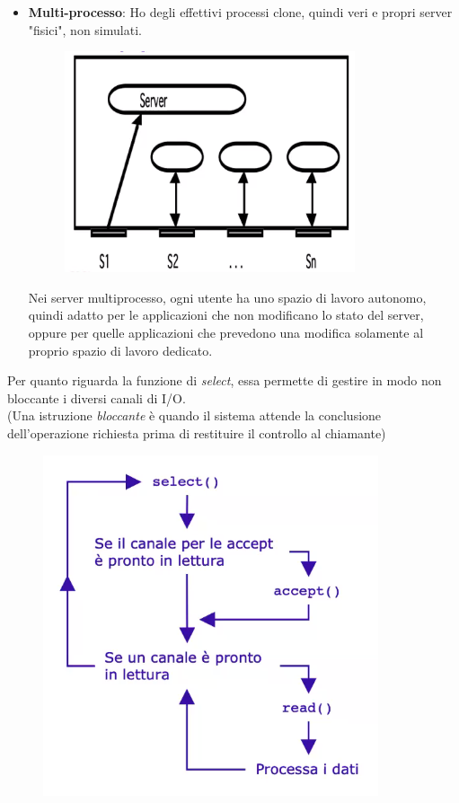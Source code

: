 \documentclass[12pt, a4paper]{article}
\begin{document}
\begin{itemize}
        \item \textbf{Multi-processo}:
        Ho degli effettivi processi clone, quindi veri e propri server "fisici", non simulati.

        \begin{figure}[htbp]
            \centering
            \includegraphics[scale=0.5]{multiprocesso.png}
            
            
        \end{figure}
        Nei server multiprocesso, ogni utente ha uno spazio di lavoro autonomo, quindi adatto
        per le applicazioni che non modificano lo stato del server, oppure per quelle applicazioni
        che prevedono una modifica solamente al proprio spazio di lavoro dedicato.
    \end{itemize}
    \newpage
    Per quanto riguarda la funzione di \textit{select}, essa permette di gestire in modo non bloccante
    i diversi canali di I/O.
    \\(Una istruzione \textit{bloccante} è quando il sistema attende la conclusione dell'operazione 
    richiesta prima di restituire il controllo al chiamante)

    \begin{figure}[htbp]
        \centering
        \includegraphics[scale=0.66]{select.png}
    \end{figure}
\end{document}
